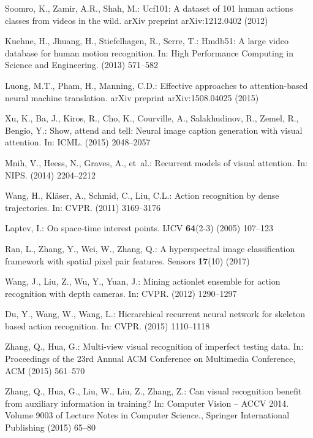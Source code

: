 \documentclass[runningheads,a4paper]{llncs}
\begin{document}
\begin{thebibliography}{10}
	Soomro, K., Zamir, A.R., Shah, M.:
	\newblock Ucf101: A dataset of 101 human actions classes from videos in the
	wild.
	\newblock arXiv preprint arXiv:1212.0402 (2012)

	Kuehne, H., Jhuang, H., Stiefelhagen, R., Serre, T.:
	\newblock Hmdb51: A large video database for human motion recognition.
	\newblock In: High Performance Computing in Science and Engineering.
	\newblock (2013)  571--582

	Luong, M.T., Pham, H., Manning, C.D.:
	\newblock Effective approaches to attention-based neural machine translation.
	\newblock arXiv preprint arXiv:1508.04025 (2015)

	Xu, K., Ba, J., Kiros, R., Cho, K., Courville, A., Salakhudinov, R., Zemel, R.,
	Bengio, Y.:
	\newblock Show, attend and tell: Neural image caption generation with visual
	attention.
	\newblock In: ICML. (2015)  2048--2057

	Mnih, V., Heess, N., Graves, A.,  et~al.:
	\newblock Recurrent models of visual attention.
	\newblock In: NIPS. (2014)  2204--2212

	Wang, H., Kl{\"a}ser, A., Schmid, C., Liu, C.L.:
	\newblock Action recognition by dense trajectories.
	\newblock In: CVPR. (2011)  3169--3176

	Laptev, I.:
	\newblock On space-time interest points.
	\newblock IJCV \textbf{64}(2-3) (2005)  107--123

	Ran, L., Zhang, Y., Wei, W., Zhang, Q.:
	\newblock A hyperspectral image classification framework with spatial pixel
	pair features.
	\newblock Sensors \textbf{17}(10) (2017)

	Wang, J., Liu, Z., Wu, Y., Yuan, J.:
	\newblock Mining actionlet ensemble for action recognition with depth cameras.
	\newblock In: CVPR. (2012)  1290--1297

	Du, Y., Wang, W., Wang, L.:
	\newblock Hierarchical recurrent neural network for skeleton based action
	recognition.
	\newblock In: CVPR. (2015)  1110--1118

	Zhang, Q., Hua, G.:
	\newblock Multi-view visual recognition of imperfect testing data.
	\newblock In: Proceedings of the 23rd Annual ACM Conference on Multimedia
	Conference, ACM (2015)  561--570

	Zhang, Q., Hua, G., Liu, W., Liu, Z., Zhang, Z.:
	\newblock Can visual recognition benefit from auxiliary information in
	training?
	\newblock In: Computer Vision -- ACCV 2014. Volume 9003 of Lecture Notes in
	Computer Science., Springer International Publishing (2015)  65--80


\end{thebibliography}
\end{document}
